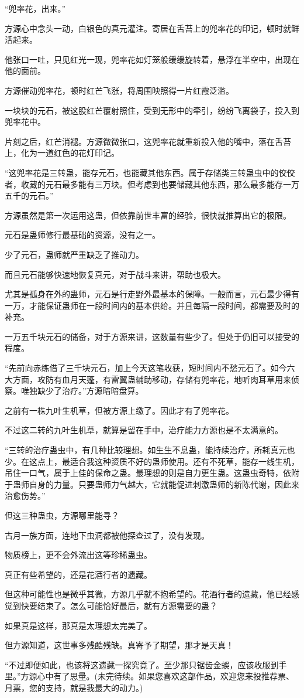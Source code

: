 \begin{this_body}
“兜率花，出来。”

方源心中念头一动，白银色的真元灌注。寄居在舌苔上的兜率花的印记，顿时就鲜活起来。

他张口一吐，只见红光一现，兜率花如灯笼般缓缓旋转着，悬浮在半空中，出现在他的面前。

方源催动兜率花，顿时红芒飞涨，将周围映照得一片红霞泛滥。

一块块的元石，被这股红芒覆射照住，受到无形中的牵引，纷纷飞离袋子，投入到兜率花中。

片刻之后，红芒消褪。方源微微张口，这兜率花就重新投入他的嘴中，落在舌苔上，化为一道红色的花灯印记。

“这兜率花是三转蛊，能存元石，也能藏其他东西。属于存储类三转蛊虫中的佼佼者，收藏的元石最多能有三万块。但考虑到也要储藏其他东西，那么最多能存一万五千的元石。”

方源虽然是第一次运用这蛊，但依靠前世丰富的经验，很快就推算出它的极限。

元石是蛊师修行最基础的资源，没有之一。

少了元石，蛊师就严重缺乏了推动力。

而且元石能够快速地恢复真元，对于战斗来讲，帮助也极大。

尤其是孤身在外的蛊师，元石是行走野外最基本的保障。一般而言，元石最少得有一万，才能保证蛊师在一段时间内的基本供给。并且每隔一段时间，都需要及时的补充。

一万五千块元石的储备，对于方源来讲，这数量有些少了。但处于仍旧可以接受的程度。

“先前向赤练借了三千块元石，加上今天这笔收获，短时间内不愁元石了。如今六大方面，攻防有血月天蓬，有雷翼蛊辅助移动，存储有兜率花，地听肉耳草用来侦察。唯独缺少了治疗。”方源暗暗盘算。

之前有一株九叶生机草，但被方源上缴了。因此才有了兜率花。

不过这二转的九叶生机草，就算是留在手中，治疗能力方源也是不太满意的。

“三转的治疗蛊虫中，有几种比较理想。如生生不息蛊，能持续治疗，所耗真元也少。在这点上，最适合我这种资质不好的蛊师使用。还有不死草，能存一线生机，吊住一口气，属于上佳的保命之蛊。最理想的则是自力更生蛊。这蛊虫奇特，依附于蛊师自身的力量。只要蛊师力气越大，它就能促进刺激蛊师的新陈代谢，因此来治愈伤势。”

但这三种蛊虫，方源哪里能寻？

古月一族方面，连地下虫洞都被他探查过了，没有发现。

物质榜上，更不会外流出这等珍稀蛊虫。

真正有些希望的，还是花酒行者的遗藏。

但这种可能性也是微乎其微，方源几乎就不抱希望的。花酒行者的遗藏，他已经感觉到快要结束了。怎么可能恰好最后，就有方源需要的蛊？

如果真是这样，那真是太理想太完美了。

但方源知道，这世事多残酷残缺。真寄予了期望，那才是天真！

“不过即便如此，也该将这遗藏一探究竟了。至少那只锯齿金蜈，应该收服到手里。”方源心中有了思量。(未完待续。如果您喜欢这部作品，欢迎您来投推荐票、月票，您的支持，就是我最大的动力。)

\end{this_body}

